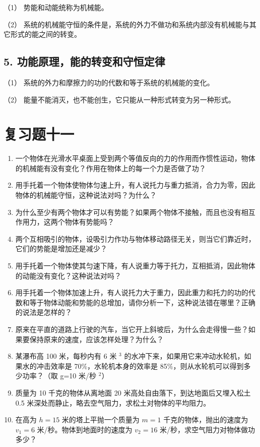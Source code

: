 （1） 势能和动能统称为机械能。

（2）
系统的机械能守恒的条件是，系统的外力不做功和系统内部没有机械能与其它形式的能之间的转变。

\subsection{5.
功能原理，能的转变和守恒定律}\label{ux529fux80fdux539fux7406ux80fdux7684ux8f6cux53d8ux548cux5b88ux6052ux5b9aux5f8b}

（1） 系统的外力和摩擦力的功的代数和等于系统的机械能的变化。

（2） 能量不能消灭，也不能创生，它只能从一种形式转变为另一种形式。

\section{复习题十一}\label{ux590dux4e60ux9898ux5341ux4e00}

\begin{enumerate}
\def\labelenumi{\arabic{enumi}.}
\item
  一个物体在光滑水平桌面上受到两个等值反向的力的作用而作惯性运动，物体的机械能有没有变化？作用在物体上的每一个力是否做了功？
\item
  用手托着一个物体使物体匀速上升，有人说托力与重力抵消，合力为零，因此物体的机械能守恒，这种说法对吗？为什么？
\item
  为什么至少有两个物体才可以有势能？如果两个物体不接触，而且也没有相互作用力，这两个物体有势能吗？
\item
  两个互相吸引的物体，设吸引力作功与物体移动路径无关，则当它们靠近时，它们的势能是增加还是减少？
\item
  用手托着一个物体使其匀速下降，有人说重力等于托力，互相抵消，因此物体的动能没有变化？这种说法对吗？
\item
  用手托着一个物体加速上升，有人说托力大于重力，因此重力和托力的功的代数和等于物体动能和势能的总增加，请你分析一下，这种说法错在哪里？正确的说法是怎样的？
\item
  原来在平直的道路上行驶的汽车，当它开上斜坡后，为什么会走得慢一些？如果要保持原来的速度，应该怎样处理？为什么？
\item
  某瀑布高 100 米，每秒内有 6 米 \(^{3}\)
  的水冲下来，如果用它来冲动水轮机，如果水的冲击效率是
  70\%，水轮机本身的效率是 85\%，则从水轮机可以得到多少功率？（取 g=10
  米/秒 \(^{2}\)）
\item
  质量为 10 千克的物体从离地面 20 米高处自由落下，到达地面后又埋入松土
  0.5 米深处而静止，略去空气阻力，求松土对物体的平均阻力。
\item
  在高为 \(h = 15\) 米的塔上平抛一个质量为 \(m = 1\)
  千克的物体，抛出的速度为 \(v_{1} = 6\) 米/秒。物体到地面时的速度为
  \(v_{2} = 16\) 米/秒，求空气阻力对物体做功多少？
\end{enumerate}

